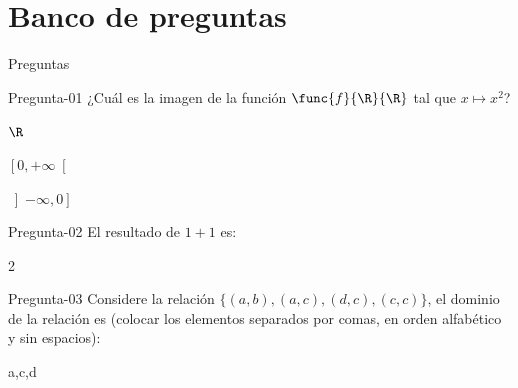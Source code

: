 \documentclass[a4,11pt]{aleph-notas}
\begin{document}
\encabezado

\section{Banco de preguntas}

\begin{quiz}{Preguntas}

\begin{multi}[%
    feedback={La respuesta correcta es $\left[0,+\infty\right[$}
    ]%
    {Pregunta-01}
    ¿Cuál es la imagen de la función $\func{f}{\R}{\R}$ tal que $x\mapsto x^2$?
    \item $\R$
    \item* $\left[0,+\infty\right[$
    \item $\left]-\infty,0\right]$
\end{multi}

\begin{numerical}[tolerance=0.1,%
    feedback={La suma es igual a $2$.}
    ]%
    {Pregunta-02}
    El resultado de $1+1$ es:
    \item 2
\end{numerical}

\begin{shortanswer}[%
    feedback={El dominio de la relación es $\{a,c,d\}$}
    ]%
    {Pregunta-03}
    Considere la relación $\{(a,b), (a,c), (d,c), (c,c)\}$, el dominio de la relación es (colocar los elementos separados por comas, en orden alfabético y sin espacios):
    \item a,c,d
\end{shortanswer}


\end{quiz}
\end{document}
